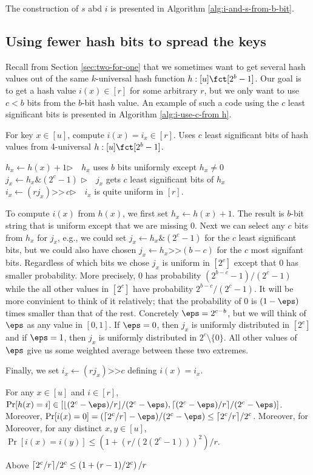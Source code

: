 The construction of $s$ abd $i$ is presented in Algorithm \ref{alg:i-and-s-from-b-bit}.




\subsection{Using fewer hash bits to spread the keys}
Recall from Section \ref{sec:two-for-one} that we sometimes want to
get several hash values out of the same $k$-universal hash function
$h:[u]\fct[2^b-1]$. Our goal is to get a hash value $i(x)\in [r]$ for
some arbitrary $r$, but we only want to use $c<b$ bits from the
$b$-bit hash value. An example of such a code using the $c$ least
significant bits is presented in Algorithm \ref{alg:i-use-c-from h}.
\begin{algorithm}\label{alg:i-use-c-from h}
  \caption{For key $x\in [u]$, compute $i(x)=i_x\in[r]$.
    Uses $c$
    least significant bits of hash values from 4-universal $h:[u]\fct
    [2^b-1]$.}  
   $h_x\gets h(x)+1$\hfill $\rhd\quad h_x$ uses $b$ bits
  uniformly except $h_x\neq 0$\\ 
  $j_x\gets h_x\&(2^c-1)$\hfill
  $\rhd\quad j_x$ gets $c$ least significant bits of
  $h_x$\\ $i_x\gets (rj_x)\texttt{>>}\,c$\hfill $\rhd\quad i_x$ is
  quite uniform in $[r]$.
\end{algorithm}  
To compute $i(x)$ from $h(x)$, we first set 
$h_x\gets h(x)+1$. The result is $b$-bit string that is uniform except
that we are missing 0. Next we can select any $c$ bits from $h_x$
for $j_x$, e.g., we could set $j_x\gets h_x\texttt\&(2^c-1)$ for
the $c$ least significant bits, but we could also have chosen
$j_x\gets h_x\texttt{>>}(b-c)$ for the $c$ most signifant bits.
Regardless of which bits we chose $j_x$ is uniform in $[2^c]$
except that $0$ has smaller probability. More precisely, 
$0$ has probability $(2^{b-c}-1)/(2^c-1)$ while the all
other values in $[2^c]$ have probability $2^{b-c}/(2^c-1)$.
It will be more convinient to think of it relatively; that
the probability of $0$ is $(1-\eps)$ times smaller than that of 
the rest. Concretely $\eps=2^{c-b}$, but we will think of $\eps$ as
any value in $[0,1]$. If $\eps=0$, then $j_x$ is
uniformly distributed in $[2^c]$ and if
$\eps=1$, then $j_x$ is uniformly distributed in $2^c\setminus\{0\}$.
All other values of $\eps$ give us some weighted average between
these two extremes.

Finally, we set $i_x\gets (rj_x)\texttt{>>}c$ defining $i(x)=i_x$.
\begin{lemma} For any $x\in[u]$ and $i\in[r]$, 
$\Pr[h(x)=i] \in[\floor{(2^c-\eps)/r}/(2^c-\eps), \ceil{(2^c-\eps)/r}/(2^c-\eps)]$. Moreover, 
$\Pr[i(x)=0]=(\ceil{2^c/r}-\eps)/(2^c-\eps)\leq \ceil{2^c/r}/2^c$. Moreover, for 
Moreover, for any distinct $x,y\in [u]$, $\Pr[i(x)=i(y)]\leq \left(1+(r/(2(2^c-1)))^2\right)/r$.
\end{lemma}
Above $\lceil {2^c/r}\rceil/2^c\leq\left(1+(r-1)/2^c\right)/r$


